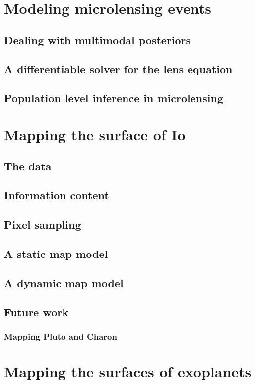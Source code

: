 \documentclass[]{report}
\begin{document}
\chapter{Modeling microlensing events}
\section{Dealing with multimodal posteriors}
\section{A differentiable solver for the lens equation}
\section{Population level inference in microlensing}

\chapter{Mapping the surface of Io}
\section{The data}
\section{Information content}
\section{Pixel sampling}
\section{A static map model}
\section{A dynamic map model}
\section{Future work}
\subsection{Mapping Pluto and Charon}

\chapter{Mapping the surfaces of exoplanets}
\end{document}
